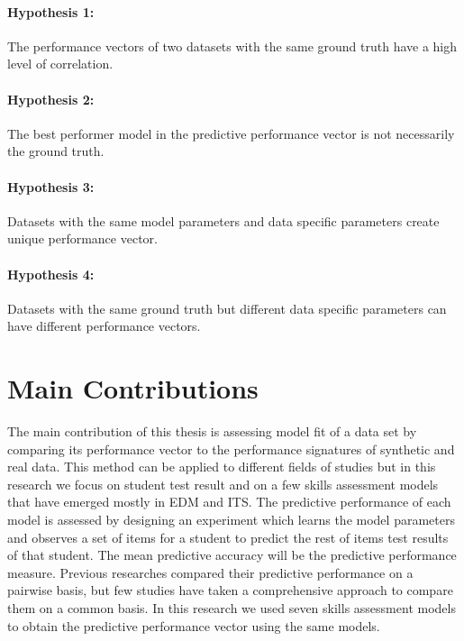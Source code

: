 \paragraph{Hypothesis 1:} The performance vectors of two datasets with the same ground truth have a high level of correlation.
\paragraph{Hypothesis 2:} The best performer model in the predictive performance vector is not necessarily the ground truth.
\paragraph{Hypothesis 3:} Datasets with the same model parameters and data specific parameters create unique performance vector. %
\paragraph{Hypothesis 4:} Datasets with the same ground truth but different data specific parameters can have different performance vectors. 


\section{Main Contributions}

The main contribution of this thesis is assessing model fit of a data set by comparing its performance vector to the performance signatures of synthetic and real data. This method can be applied to different fields of studies but in this research we focus on student test result and on a few skills assessment models that have emerged mostly in EDM and ITS. The predictive performance of each model is assessed by designing an experiment which learns the model parameters and observes a set of items for a student to predict the rest of items test results of that student. The mean predictive accuracy will be the predictive performance measure. Previous researches compared their predictive performance  on a pairwise basis, but few studies have taken a comprehensive approach to compare them on a common basis. In this research we used seven skills assessment models to obtain the predictive performance vector using the same models. 

